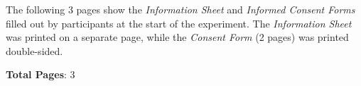 The following 3 pages show the \emph{Information Sheet} and \emph{Informed Consent Forms} filled out by participants at the start of the experiment. The \emph{Information Sheet} was printed on a separate page, while the \emph{Consent Form} (2 pages) was printed double-sided.

\textbf{Total Pages}: 3



